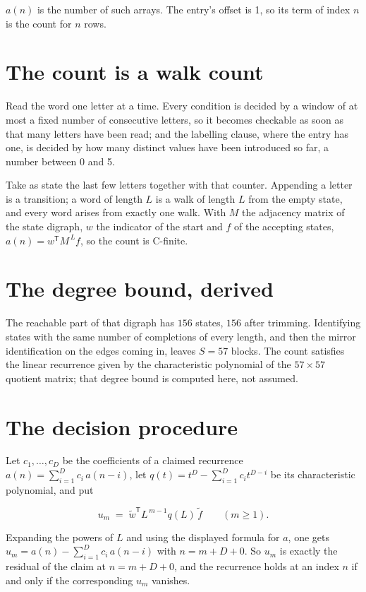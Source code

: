 \documentclass[11pt]{article}
\theoremstyle{definition}
\begin{document}
$a(n)$ is the number of such arrays. The entry's offset is 1, so its term of index $n$ is the count for $n$ rows.

\section{The count is a walk count}

Read the word one letter at a time. Every condition is decided by a window of at most a fixed number of consecutive letters, so it becomes checkable as soon as that many letters have been read; and the labelling clause, where the entry has one, is decided by how many distinct values have been introduced so far, a number between $0$ and 5.

Take as state the last few letters together with that counter. Appending a letter is a transition; a word of length $L$ is a walk of length $L$ from the empty state, and every word arises from exactly one walk. With $M$ the adjacency matrix of the state digraph, $w$ the indicator of the start and $f$ of the accepting states, $a(n) = w^{\mathsf T}M^{\,L}f$, so the count is C-finite.

\section{The degree bound, derived}

The reachable part of that digraph has $156$ states, $156$ after trimming. Identifying states with the same number of completions of every length, and then the mirror identification on the edges coming in, leaves $S = 57$ blocks. The count satisfies the linear recurrence given by the characteristic polynomial of the $57\times57$ quotient matrix; that degree bound is computed here, not assumed.

\section{The decision procedure}

Let $c_1,\dots,c_D$ be the coefficients of a claimed recurrence $a(n) = \sum_{i=1}^{D} c_i\,a(n-i)$, let $q(t) = t^{D} - \sum_{i=1}^{D} c_i t^{D-i}$ be its characteristic polynomial, and put

\[u_m \;=\; \tilde w^{\mathsf T} L^{\,m-1} q(L)\,\tilde f \qquad (m \ge 1).\]

Expanding the powers of $L$ and using the displayed formula for $a$, one gets $u_m = a(n) - \sum_{i=1}^{D} c_i\,a(n-i)$ with $n = m + D + 0$. So $u_m$ is exactly the residual of the claim at $n = m + D + 0$, and the recurrence holds at an index $n$ if and only if the corresponding $u_m$ vanishes.
\end{document}
